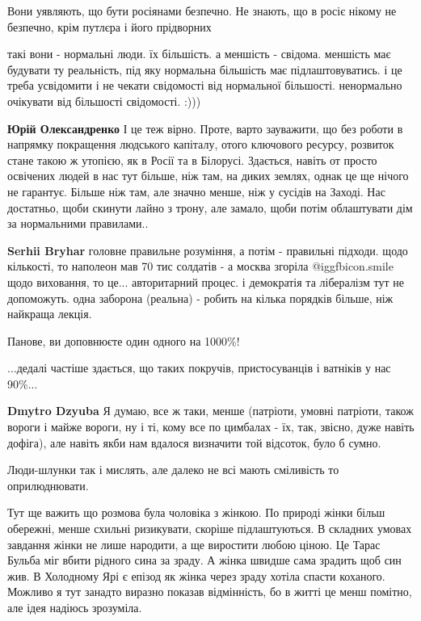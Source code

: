 \begin{itemize}
Вони уявляють, що бути росіянами безпечно. Не знають, що в росіє нікому не безпечно, крім путлєра і його прідворних


такі вони - нормальні люди. їх більшість. а меншість - свідома. меншість має
будувати ту реальність, під яку нормальна більшість має підлаштовуватись. і це
треба усвідомити і не чекати свідомості від нормальної більшості. ненормально
очікувати від більшості свідомості. :)))

\begin{itemize} %
\textbf{Юрій Олександренко} І це теж вірно. Проте, варто зауважити, що без роботи в напрямку покращення людського капіталу, отого ключового ресурсу, розвиток стане такою ж утопією, як в Росії та в Білорусі. Здається, навіть от просто освічених людей в нас тут більше, ніж там, на диких землях, однак це ще нічого не гарантує. Більше ніж там, але значно менше, ніж у сусідів на Заході. Нас достатньо, щоби скинути лайно з трону, але замало, щоби потім облаштувати дім за нормальними правилами..

\textbf{Serhii Bryhar} головне правильне розуміння, а потім - правильні підходи. щодо кількості, то наполеон мав 70 тис солдатів - а москва згоріла  @igg{fbicon.smile} 
щодо виховання, то це... авторитарний процес. і демократія та лібералізм тут не допоможуть. одна заборона (реальна) - робить на кілька порядків більше, ніж найкраща лекція.

Панове, ви доповнюєте один одного на 1000\%!
\end{itemize} %


...дедалі частіше здається, що таких покручів, пристосуванців і ватніків у нас
90\%...

\begin{itemize} %
\textbf{Dmytro Dzyuba} Я думаю, все ж таки, менше (патріоти, умовні патріоти, також вороги і майже вороги, ну і ті, кому все по цимбалах - їх, так, звісно, дуже навіть дофіга), але навіть якби нам вдалося визначити той відсоток, було б сумно.
\end{itemize} %


Люди-шлунки так і мислять, але далеко не всі мають сміливість то оприлюднювати.


Тут ще важить що розмова була чоловіка з жінкою. По природі жінки більш
обережні, менше схильні ризикувати, скоріше підлаштуються. В складних умовах
завдання жінки не лише народити, а ще виростити любою ціною. Це Тарас Бульба
міг вбити рідного сина за зраду. А жінка швидше сама зрадить щоб син жив. В
Холодному Ярі є епізод як жінка через зраду хотіла спасти коханого. Можливо я
тут занадто виразно показав відмінність, бо в житті це менш помітно, але ідея
надіюсь зрозуміла.


\end{itemize}
